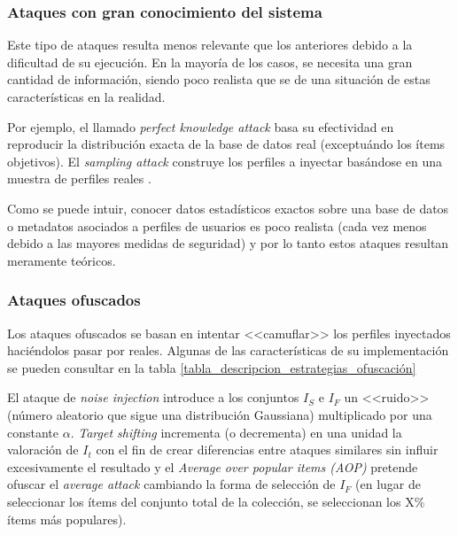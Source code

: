 \subsubsection{Ataques con gran conocimiento del sistema}

Este tipo de ataques resulta menos relevante que los anteriores debido a la dificultad de su ejecución. En la mayoría de los casos, se necesita una gran cantidad de información, siendo poco realista que se de una situación de estas características en la realidad.

Por ejemplo, el llamado \textit{perfect knowledge attack} \cite{Mobasher2006Thesis} basa su efectividad en reproducir la distribución exacta de la base de datos real (exceptuándo los ítems objetivos). El \textit{sampling attack} construye los perfiles a inyectar basándose en una muestra de perfiles reales \cite{mingdan2018ShillingAttacksAReview}.

Como se puede intuir, conocer datos estadísticos exactos sobre una base de datos o metadatos asociados a perfiles de usuarios es poco realista (cada vez menos debido a las mayores medidas de seguridad) y por lo tanto estos ataques resultan meramente teóricos.

\subsubsection{Ataques ofuscados}

Los ataques ofuscados \cite{mingdan2018ShillingAttacksAReview} se basan en intentar <<camuflar>> los perfiles inyectados haciéndolos pasar por reales. Algunas de las características de su implementación se pueden consultar en la tabla \ref{tabla_descripcion_estrategias_ofuscación}

El ataque de \textit{noise injection} introduce a los conjuntos $I_S$ e $I_F$ un <<ruido>> (número aleatorio que sigue una distribución Gaussiana) multiplicado por una constante $\alpha$. \textit{Target shifting} incrementa (o decrementa) en una unidad la valoración de $I_t$ con el fin de crear diferencias entre ataques similares sin influir excesivamente el resultado y el \textit{Average over popular items (AOP)} pretende ofuscar el \textit{average attack} cambiando la forma de selección de $I_F$ (en lugar de seleccionar los ítems del conjunto total de la colección, se seleccionan los X\% ítems más populares).


